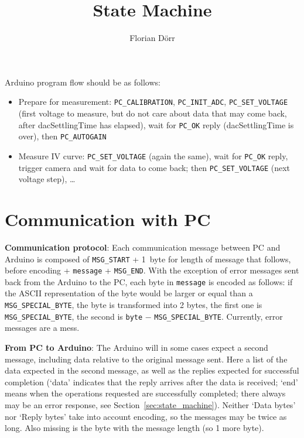 \documentclass[11pt,a4paper,english]{article}
\author{Florian Dörr}
\title{State Machine}
\begin{document}
\titlepage

Arduino program flow should be as follows:
\begin{itemize}
\item Prepare for measurement: \texttt{PC\_CALIBRATION}, \texttt{PC\_INIT\_ADC}, \texttt{PC\_SET\_VOLTAGE} (first voltage to measure, but do not care about data that may come back, after dacSettlingTime has elapsed), wait for \texttt{PC\_OK} reply (dacSettlingTime is over), then \texttt{PC\_AUTOGAIN}
\item Measure IV curve: \texttt{PC\_SET\_VOLTAGE} (again the same), wait for \texttt{PC\_OK} reply, trigger camera and wait for data to come back; then \texttt{PC\_SET\_VOLTAGE} (next voltage step), \ldots
\end{itemize}

\section{Communication with PC}
\textbf{Communication protocol}: Each communication message between PC and Arduino is composed of \texttt{MSG\_START} + 1~byte for length of message that follows, before encoding + \texttt{message} + \texttt{MSG\_END}. With the exception of error messages sent back from the Arduino to the PC, each byte in \texttt{message} is encoded as follows: if the ASCII representation of the byte would be larger or equal than a \texttt{MSG\_SPECIAL\_BYTE}, the byte is transformed into 2 bytes, the first one is \texttt{MSG\_SPECIAL\_BYTE}, the second is \texttt{byte} $-$ \texttt{MSG\_SPECIAL\_BYTE}. Currently, error messages are a mess.

\vspace*{\baselineskip}
\noindent\textbf{From PC to Arduino}: The Arduino will in some cases expect a second message, including data relative to the original message sent. Here a list of the data expected in the second message, as well as the replies expected for successful completion (`data' indicates that the reply arrives after the data is received; `end' means when the operations requested are successfully completed; there always may be an error response, see Section~\ref{sec:state_machine}). Neither `Data bytes' nor `Reply bytes' take into account encoding, so the messages may be twice as long. Also missing is the byte with the message length (so 1 more byte).
\end{document}
